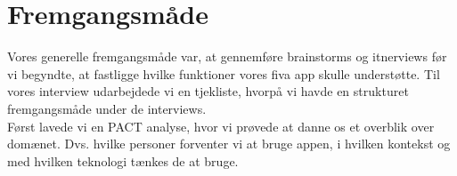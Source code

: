 \documentclass[12pt]{article}
\begin{document}

\clearpage\maketitle
\thispagestyle{empty}

\newpage

\tableofcontents %

\thispagestyle{empty}

\newpage
\pagestyle{plain}
\setcounter{page}{1}

\section{Fremgangsmåde}
Vores generelle fremgangsmåde var, at gennemføre brainstorms og itnerviews før vi begyndte, at fastligge hvilke funktioner vores fiva app skulle understøtte. Til vores interview udarbejdede vi en tjekliste, hvorpå vi havde en strukturet fremgangsmåde under de interviews.\\
Først lavede vi en PACT analyse, hvor vi prøvede at danne os et overblik over domænet. Dvs. hvilke personer forventer vi at bruge appen, i hvilken kontekst og med hvilken teknologi tænkes de at bruge.\\
\end{document}
